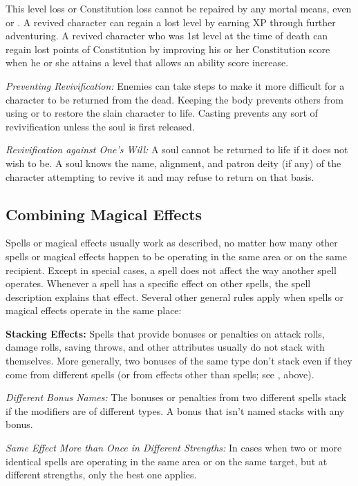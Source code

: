 This level loss or Constitution loss cannot be repaired by any mortal means, even 
 or . A revived character can regain a lost level 
by earning XP through further adventuring. A revived character who was 1st level 
at the time of death can regain lost points of Constitution by improving his or 
her Constitution score when he or she attains a level that allows an ability score 
increase.

\textit{Preventing Revivification:} Enemies can take steps to make it more difficult 
for a character to be returned from the dead. Keeping the body prevents others 
from using  or  to restore the slain character 
to life. Casting  prevents any sort of revivification unless 
the soul is first released.

\textit{Revivification against One's Will:} A soul cannot be returned to life if 
it does not wish to be. A soul knows the name, alignment, and patron deity (if 
any) of the character attempting to revive it and may refuse to return on that 
basis.

\subsection{Combining Magical Effects}

Spells or magical effects usually work as described, no matter how many other spells 
or magical effects happen to be operating in the same area or on the same recipient. 
Except in special cases, a spell does not affect the way another spell operates. 
Whenever a spell has a specific effect on other spells, the spell description explains 
that effect. Several other general rules apply when spells or magical effects operate 
in the same place:

\textbf{Stacking Effects:} Spells that provide bonuses or penalties on attack rolls, 
damage rolls, saving throws, and other attributes usually do not stack with themselves. 
More generally, two bonuses of the same type don't stack even if they come from 
different spells (or from effects other than spells; see , above). 

\textit{Different Bonus Names:} The bonuses or penalties from two different spells 
stack if the modifiers are of different types. A bonus that isn't named stacks 
with any bonus.

\textit{Same Effect More than Once in Different Strengths:} In cases when two or 
more identical spells are operating in the same area or on the same target, but 
at different strengths, only the best one applies.

